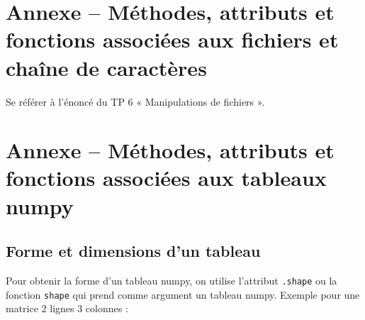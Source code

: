 \newpage
% 
% 
% 
% 
% 
% 
% 
% 
% 

\section{Annexe -- Méthodes, attributs et fonctions associées aux fichiers et chaîne de caractères}

Se référer à l'énoncé du TP 6 « Manipulations de fichiers ».

\section{Annexe -- Méthodes, attributs et fonctions associées aux tableaux numpy}


\subsection{Forme et dimensions d'un tableau}
Pour obtenir la forme d'un tableau numpy, on utilise l'attribut \verb|.shape| ou la fonction \verb|shape| qui prend comme argument un tableau numpy. Exemple pour une matrice 2 lignes 3 colonnes :

